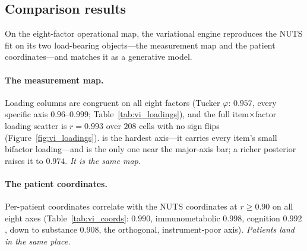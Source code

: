 \subsection{Comparison results}

On the eight-factor operational map, the variational engine reproduces the NUTS fit on its two
load-bearing objects---the measurement map and the patient coordinates---and matches it as a
generative model.

\paragraph{The measurement map.} Loading columns are congruent on all eight factors (Tucker
$\varphi$: \Gfac{} $0.957$, every specific axis $0.96$--$0.999$; Table~\ref{tab:vi_loadings}),
and the full item$\times$factor loading scatter is $r=0.993$ over $208$ cells with no sign flips
(Figure~\ref{fig:vi_loadings}). \Gfac{} is the hardest axis---it carries every item's small
bifactor loading---and is the only one near the major-axis bar; a richer posterior raises it to
$0.974$. \emph{It is the same map.}

\paragraph{The patient coordinates.} Per-patient coordinates correlate with the NUTS
coordinates at $r\ge0.90$ on all eight axes (Table~\ref{tab:vi_coords}: \Gfac{} $0.990$,
immunometabolic $0.998$, cognition $0.992$, down to substance $0.908$, the orthogonal,
instrument-poor axis). \emph{Patients land in the same place.}

